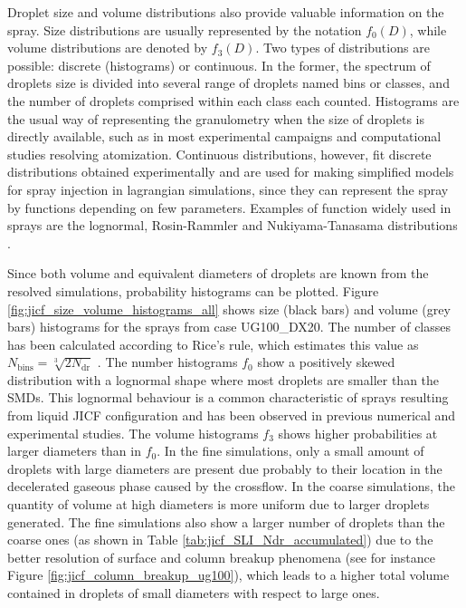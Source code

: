 \clearpage


Droplet size and volume distributions also provide valuable information on the spray. Size distributions are usually represented by the notation $f_0 \left( D \right)$, while volume distributions are denoted by $f_3 \left( D \right)$. Two types of distributions are possible: discrete (histograms) or continuous. In the former, the spectrum of droplets size is divided into several range of droplets named bins or classes, and the number of droplets comprised within each class each counted. Histograms are the usual way of representing the granulometry when the size of droplets is directly available, such as in most experimental campaigns and computational studies resolving atomization. Continuous distributions, however, fit discrete distributions obtained experimentally and are used for making simplified models for spray injection in lagrangian simulations, since they can represent the spray by functions depending on few parameters. Examples of function widely used in sprays are the lognormal, Rosin-Rammler and Nukiyama-Tanasama distributions . 

Since both volume and equivalent diameters of droplets are known from the resolved simulations, probability histograms can be plotted. Figure \ref{fig:jicf_size_volume_histograms_all} shows size (black bars) and volume (grey bars) histograms for the sprays from case UG100\_DX20. The number of classes has been calculated according to Rice's rule, which estimates this value as $N_\mathrm{bins} = \sqrt[3]{2 N_\mathrm{dr}}$ . The number histograms $f_0$ show a positively skewed distribution with a lognormal shape where most droplets are smaller than the SMDs. This lognormal behaviour is a common characteristic of sprays resulting from liquid JICF configuration and has been observed in previous numerical  and experimental  studies. The volume histograms $f_3$ shows higher probabilities at larger diameters than in $f_0$. In the fine simulations, only a small amount of droplets with large diameters are present due probably to their location in the decelerated gaseous phase caused by the crossflow. In the coarse simulations, the quantity of volume at high diameters is more uniform due to larger droplets generated. The fine simulations also show a larger number of droplets than the coarse ones (as shown in Table \ref{tab:jicf_SLI_Ndr_accumulated}) due to the better resolution of surface and column breakup phenomena (see for instance Figure \ref{fig:jicf_column_breakup_ug100}), which leads to a higher total volume contained in droplets of small diameters with respect to large ones.

